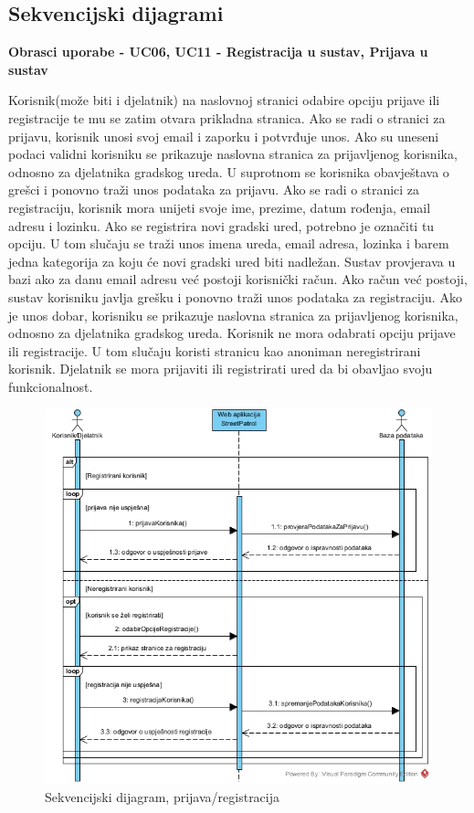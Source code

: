 				\eject		
				
			\subsection{Sekvencijski dijagrami}
				
				\textbf{Obrasci uporabe - UC06, UC11 - Registracija u sustav, Prijava u sustav}
				
				Korisnik(može biti i djelatnik) na naslovnoj stranici odabire opciju prijave ili registracije te mu se zatim otvara prikladna stranica. Ako se radi o stranici za prijavu, korisnik unosi svoj email i zaporku i potvrđuje unos. Ako su uneseni podaci validni korisniku se prikazuje naslovna stranica za prijavljenog korisnika, odnosno za djelatnika gradskog ureda. U suprotnom se korisnika obavještava o grešci i ponovno traži unos podataka za prijavu. Ako se radi o stranici za registraciju, korisnik mora unijeti svoje ime, prezime, datum rođenja, email adresu i lozinku. Ako se registrira novi gradski ured, potrebno je označiti tu opciju. U tom slučaju se traži unos imena ureda, email adresa, lozinka i barem jedna kategorija za koju će novi gradski ured biti nadležan. Sustav provjerava u bazi ako za danu email adresu već postoji korisnički račun. Ako račun već postoji, sustav korisniku javlja grešku i ponovno traži unos podataka za registraciju. Ako je unos dobar, korisniku se prikazuje naslovna stranica za prijavljenog korisnika, odnosno za djelatnika gradskog ureda. Korisnik ne mora odabrati opciju prijave ili registracije. U tom slučaju koristi stranicu kao anoniman neregistrirani korisnik. Djelatnik se mora prijaviti ili registrirati ured da bi obavljao svoju funkcionalnost.
				
				\begin{figure}[H]
					\includegraphics[width=\textwidth]{slike/Prijava_registracijaSD.jpg} %
					\caption{Sekvencijski dijagram, prijava/registracija}
					\label{fig:sekvencijskiDijagram1} %
				\end{figure}
				\eject
				

